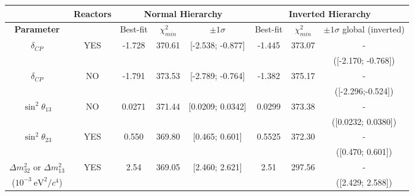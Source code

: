 \begin{table}[htb]
\centering
\begin{tabular}{| c | c || c | c | c || c | c | c |}
\hline
								& {\bf Reactors}		& \multicolumn{3}{c||}{\bf Normal Hierarchy} & \multicolumn{3}{c|}{\bf Inverted Hierarchy} \\
\hline										
\bf Parameter						&				& Best-fit	& $\chi^2_{min}$	& $\pm 1\sigma$ 	  	 	& Best-fit		& $\chi^2_{min}$ 	& $\pm 1\sigma$ global (inverted) 	 \\
\hline
$\delta_{CP}$             				& YES      			& -1.728  	& 370.61			& [-2.538; -0.877]			& -1.445		& 373.07			& -							\\
								& 				& 		& 				& 						& 			& 				& ([-2.170; -0.768])				\\ 
\hline
$\delta_{CP}$            				& NO        			& -1.791  	& 373.53			& [-2.789; -0.764]			& -1.382		& 375.17			& -							\\
								& 				& 		& 				& 						& 			& 				& ([-2.296;-0.524]) 				\\ 
\hline
$\sin^2 \theta_{13}$    				& NO             		& 0.0271 & 371.44			& [0.0209; 0.0342]			& 0.0299		& 373.38			& -							\\
								& 				& 		& 				& 						& 			& 				& ([0.0232; 0.0380]) 				\\ 
\hline
$\sin^2 \theta_{23}$                      		& YES       		& 0.550	& 369.80			& [0.465; 0.601]			& 0.5525		& 372.30			& -                 					\\
								& 				& 		& 				& 						& 			& 				& ([0.470; 0.601])			  	\\ 
\hline
$\Delta m^2_{32}$ or $\Delta m^2_{13}$   & YES  			& 2.54 	& 369.05	 		& [2.460; 2.621]			& 2.51 		& 297.56			& -     						\\
($10^{-3} ~\text{eV}^2 / c^4$) 			& 				& 		&				&						&			&				& ([2.429; 2.588])							\\


\end{tabular}
\end{table}
